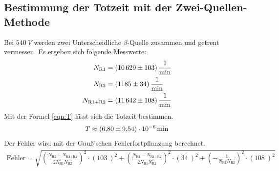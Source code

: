 \subsection{Bestimmung der Totzeit mit der Zwei-Quellen-Methode}
Bei $\SI{540}{V}$ werden zwei Unterscheidliche $\beta$-Quelle zusammen und getrent vermessen.
Es ergeben sich folgende Messwerte:
\begin{align*}
  N_{\text{R1}}&=\SI{10629\pm103}{\frac{1}{min}}\\
  N_{\text{R2}}&=\SI{1185\pm34}{\frac{1}{min}}\\
  N_{\text{R1+R2}}&=\SI{11642\pm108}{\frac{1}{min}}
\end{align*}
Mit der Formel \ref{eqn:T} lässt sich die Totzeit bestimmen.
\begin{align*}
  T\approx\SI{6,8\pm9,54e-6}{min}
\end{align*}
Der Fehler wird mit der Gauß'schen Fehlerfortpflanzung berechnet.
\begin{align*}
  \text{Fehler}=\sqrt{ \left(\frac{N_{\text{R2}}-N_{\text{R1+R2}}}{2N_{\text{R1}}^2N_{\text{R2}}}\right)^2\cdot(\SI{103}{})^2+\left(\frac{N_{\text{R1}}-N_{\text{R1+R2}}}{2N_{\text{R1}}N_{\text{R2}}^2}\right)^2\cdot(\SI{34}{})^2+\left(-\frac{1}{N_{\text{R1}}N_{\text{R2}}}\right)^2\cdot(\SI{108}{})^2}
\end{align*}

